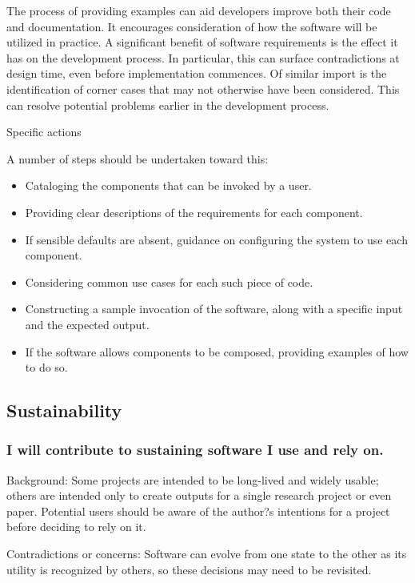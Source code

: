 \documentclass[a4paper,UKenglish]{dagman}
\renewcommand{\paragraph}[1]{\subsubsection*{#1}\xspace}
\begin{document}
The process of providing examples can aid developers improve both their code and documentation. It encourages consideration of how the software will be utilized in practice. A significant benefit of software requirements is the effect it has on the development process. In particular, this can surface contradictions at design time, even before implementation commences. Of similar import is the identification of corner cases that may not otherwise have been considered. This can resolve potential problems earlier in the development process.

Specific actions

A number of steps should be undertaken toward this:
\begin{itemize}
\item Cataloging the components that can be invoked by a user.
\item Providing clear descriptions of the requirements for each component.
\item If sensible defaults are absent, guidance on configuring the system to use each component.
\item Considering common use cases for each such piece of code.
\item Constructing a sample invocation of the software, along with a specific input and the expected output.
\item If the software allows components to be composed, providing examples of how to do so.
\end{itemize}


\subsection{Sustainability}

\paragraph{I will contribute to sustaining software I use and rely on.}


Background: Some projects are intended to be long-lived and widely usable; others are intended only to create outputs for a single research project or even paper. Potential users should be aware of the author?s intentions for a project before deciding to rely on it.  

Contradictions or concerns: Software can evolve from one state to the other as its utility is recognized by others, so these decisions may need to be revisited. 
\end{document}

